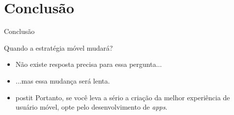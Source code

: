 \section{Conclusão}

\begin{frame}{Conclusão}
\begin{block}{Quando a estratégia móvel mudará?}
  \begin{itemize}
    \item<1-> Não existe resposta precisa para essa pergunta...
    \item<2->[] ...mas essa mudança será lenta.
    \bigskip
    \item<3->[]
      \begin{beamercolorbox}[sep=1em]{postit}
        Portanto, se você leva a sério a criação da melhor experiência de usuário móvel, opte pelo desenvolvimento de \emph{apps}.
      \end{beamercolorbox}
  \end{itemize}
\end{block}
\end{frame}
